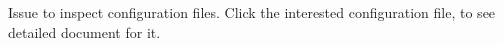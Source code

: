 \label{ch:configuration}

Issue  to inspect configuration files.
Click the interested configuration file, to see detailed document for it.
